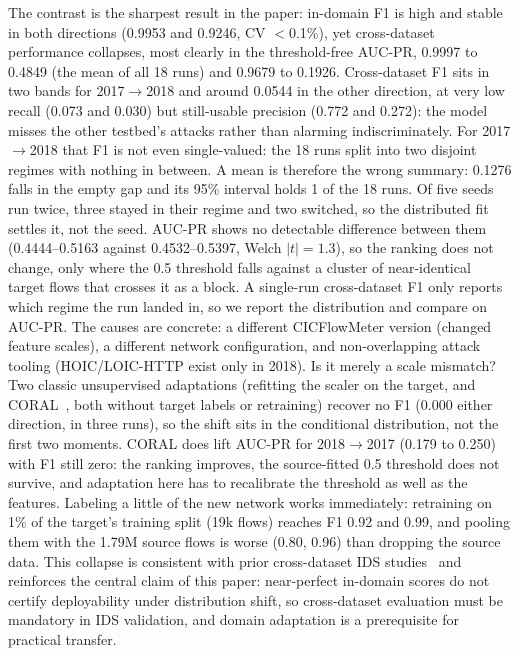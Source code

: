 \documentclass[11pt,conference,a4paper]{IEEEtran}
\begin{document}
The contrast is the sharpest result in the paper: in-domain F1 is high and stable in both directions (0.9953 and 0.9246, CV $<$0.1\%), yet cross-dataset performance collapses, most clearly in the threshold-free AUC-PR, 0.9997 to 0.4849 (the mean of all 18 runs) and 0.9679 to 0.1926. Cross-dataset F1 sits in two bands for 2017$\to$2018 and around 0.0544 in the other direction, at very low recall (0.073 and 0.030) but still-usable precision (0.772 and 0.272): the model misses the other testbed's attacks rather than alarming indiscriminately. For 2017$\to$2018 that F1 is not even single-valued: the 18 runs split into two disjoint regimes with nothing in between. A mean is therefore the wrong summary: 0.1276 falls in the empty gap and its 95\% interval holds 1 of the 18 runs. Of five seeds run twice, three stayed in their regime and two switched, so the distributed fit settles it, not the seed. AUC-PR shows no detectable difference between them (0.4444--0.5163 against 0.4532--0.5397, Welch $|t|{=}1.3$), so the ranking does not change, only where the 0.5 threshold falls against a cluster of near-identical target flows that crosses it as a block. A single-run cross-dataset F1 only reports which regime the run landed in, so we report the distribution and compare on AUC-PR. The causes are concrete: a different CICFlowMeter version (changed feature scales), a different network configuration, and non-overlapping attack tooling (HOIC/LOIC-HTTP exist only in 2018). Is it merely a scale mismatch? Two classic unsupervised adaptations (refitting the scaler on the target, and CORAL~\cite{sun2016coral}, both without target labels or retraining) recover no F1 (0.000 either direction, in three runs), so the shift sits in the conditional distribution, not the first two moments. CORAL does lift AUC-PR for 2018$\to$2017 (0.179 to 0.250) with F1 still zero: the ranking improves, the source-fitted 0.5 threshold does not survive, and adaptation here has to recalibrate the threshold as well as the features. Labeling a little of the new network works immediately: retraining on 1\% of the target's training split (19k flows) reaches F1 0.92 and 0.99, and pooling them with the 1.79M source flows is worse (0.80, 0.96) than dropping the source data. This collapse is consistent with prior cross-dataset IDS studies~\cite{dhooge2020interdataset,cantone2024crossdataset} and reinforces the central claim of this paper: near-perfect in-domain scores do not certify deployability under distribution shift, so cross-dataset evaluation must be mandatory in IDS validation, and domain adaptation is a prerequisite for practical transfer.
\end{document}
